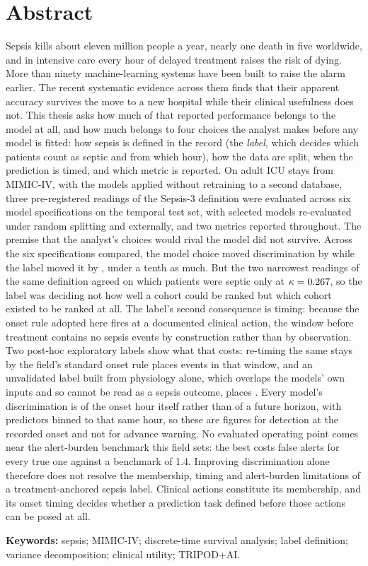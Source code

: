 \chapter*{Abstract}

Sepsis kills about eleven million people a year, nearly one death in five
worldwide, and in intensive care every hour of delayed treatment raises the
risk of dying. More than ninety machine-learning systems have been built to
raise the alarm earlier. The recent systematic evidence across them finds that
their apparent accuracy survives the move to a new hospital while their
clinical usefulness does not. This thesis asks how much of that reported
performance belongs to the model at all, and how much belongs to four choices
the analyst makes before any model is fitted: how sepsis is defined in the
record (the \emph{label}, which decides which patients count as septic and from
which hour), how the data are split, when the prediction is timed, and which
metric is reported. On \pcNStays{} adult ICU stays from MIMIC-IV, with the
models applied without retraining to a second database, three pre-registered
readings of the Sepsis-3 definition were evaluated across six model
specifications on the temporal test set, with selected models re-evaluated
under random splitting and externally, and two metrics reported throughout.
The premise that the analyst's choices would rival the model did not survive.
Across the six specifications compared, the model choice moved discrimination
by \pcSpreadModelClass{} while the label moved it by \pcSpreadLabel, under a
tenth as much. But the two narrowest readings of the same definition agreed on
which patients were septic only at $\kappa = 0.267$, so the label was
deciding not how well a cohort could be ranked but which cohort existed to be
ranked at all. The label's second consequence is timing: because the onset
rule adopted here fires at a documented clinical action, the window before
treatment contains no sepsis events by construction rather than by
observation. Two post-hoc exploratory labels show what that
costs: re-timing the same stays by the field's standard onset rule places
\pcPreTreatOnsetsVarF{} events in that window, and an unvalidated label built
from physiology alone, which overlaps the models' own inputs and so cannot be
read as a sepsis outcome, places \pcPreTreatOnsetsVarD. Every model's
discrimination is of the onset hour itself rather than of a future horizon, with
predictors binned to that same hour, so these are figures for detection at the
recorded onset and not for advance warning.
No evaluated operating point comes near the alert-burden benchmark this field
sets: the best costs \pcUtilityOptBurdenGbtB{} false alerts for every true one
against a benchmark of 1.4. Improving discrimination alone therefore does not
resolve the membership, timing and alert-burden limitations of a
treatment-anchored sepsis label. Clinical actions constitute its membership,
and its onset timing decides whether a prediction task defined before those
actions can be posed at all.

\vspace{0.4em}
\noindent\textbf{Keywords:} sepsis; MIMIC-IV; discrete-time survival analysis;
label definition; variance decomposition; clinical utility; TRIPOD+AI.
